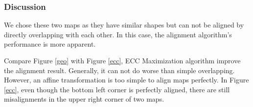 \subsubsection{Discussion}
We chose these two maps as they have similar shapes but can not be aligned by directly overlapping with each other. In this case, the alignment algorithm's performance is more apparent.

Compare Figure \ref{geo} with Figure \ref{ecc}, ECC Maximization algorithm improve the alignment result. Generally, it can not do worse than simple overlapping. However, an affine transformation is too simple to align maps perfectly. In Figure \ref{ecc}, even though the bottom left corner is perfectly aligned, there are still misalignments in the upper right corner of two maps.